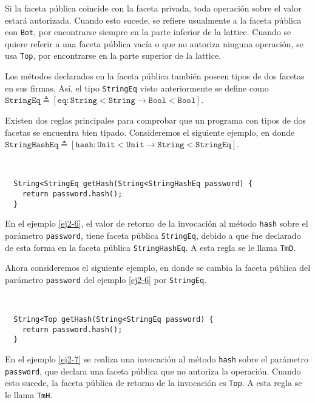 Si la faceta pública coincide con la faceta privada, toda operación sobre el valor estará autorizada. Cuando esto sucede, se refiere usualmente a la faceta pública con \texttt{Bot}, por encontrarse siempre en la parte inferior de la lattice. Cuando se quiere referir a una faceta pública vacía o que no autoriza ninguna operación, se usa \texttt{Top}, por encontrarse en la parte superior de la lattice.

Los métodos declarados en la faceta pública también poseen tipos de dos facetas en sus firmas. Así, el tipo \texttt{StringEq} visto anteriormente se define como $\mathtt{StringEq} \triangleq [\mathtt{eq} : \mathtt{String<String} \rightarrow \mathtt{Bool<Bool}]$.

Existen dos reglas principales para comprobar que un programa con tipos de dos facetas se encuentra bien tipado. Consideremos el siguiente ejemplo, en donde $\mathtt{StringHashEq} \triangleq [\mathtt{hash} : \mathtt{Unit<Unit} \rightarrow \mathtt{String<StringEq}]$.

\begin{ej} \ \\
  \normalfont
  \label{ej2-6}
\begin{lstlisting}
  String<StringEq getHash(String<StringHashEq password) {
  	return password.hash();
  }
\end{lstlisting}
\end{ej}

En el ejemplo \ref{ej2-6}, el valor de retorno de la invocación al método \texttt{hash} sobre el parámetro \texttt{password}, tiene faceta pública \texttt{StringEq}, debido a que fue declarado de esta forma en la faceta pública \texttt{StringHashEq}. A esta regla se le llama \texttt{TmD}.

Ahora consideremos el siguiente ejemplo, en donde se cambia la faceta pública del parámetro \texttt{password} del ejemplo \ref{ej2-6} por \texttt{StringEq}.
\clearpage
\begin{ej} \ \\
  \normalfont
  \label{ej2-7}
\begin{lstlisting}
  String<Top getHash(String<StringEq password) {
  	return password.hash();
  }
\end{lstlisting}
\end{ej}

En el ejemplo \ref{ej2-7} se realiza una invocación al método \texttt{hash} sobre el parámetro \texttt{password}, que declara una faceta pública que no autoriza la operación. Cuando esto sucede, la faceta pública de retorno de la invocación es \texttt{Top}. A esta regla se le llama \texttt{TmH}.

